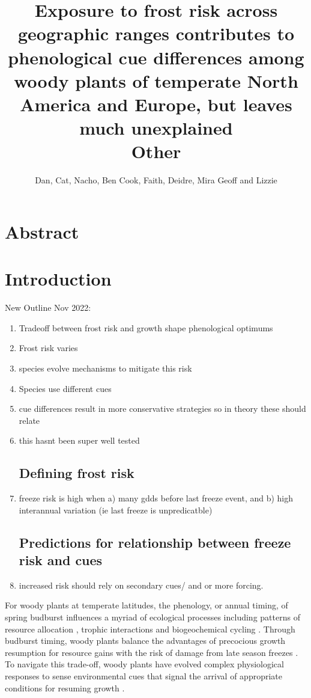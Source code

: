 \documentclass[12pt]{article}
\title{
Exposure to frost risk across geographic ranges contributes to phenological cue differences among woody plants of temperate North America and Europe, but leaves much unexplained\\
Other
}
\author{Dan, Cat, Nacho, Ben Cook, Faith, Deidre, Mira Geoff and Lizzie}
\begin{document}

\maketitle

\section*{Abstract}
\section*{Introduction}
New Outline Nov 2022:
\begin{enumerate}
\item Tradeoff between frost risk and growth shape phenological optimums
\item Frost risk varies
\item species evolve mechanisms to mitigate this risk
\item Species use different cues
\item cue differences result in more conservative strategies so in theory these should relate
\item this hasnt been super well tested
\subsection{Defining frost risk}
\item freeze risk is high when a) many gdds before last freeze event, and b) high interannual variation (ie last freeze is unpredicatble)
\subsection{Predictions for relationship between freeze risk and cues}
\item increased risk should rely on secondary cues/ and or more forcing.
\end{enumerate}


For woody plants at temperate latitudes, the phenology, or annual timing, of spring budburst influences a myriad of ecological processes including patterns of resource allocation \citep{Seiwa:1991vr}, trophic interactions \citep{Memmott2007} and biogeochemical cycling \citep{Piao2007}.
Through budburst timing, woody plants balance the advantages of precocious growth resumption for resource gains with the risk of damage from late season freezes \citep{Savage:2013aa}. 
To navigate this trade-off, woody plants have evolved complex physiological responses to sense environmental cues that signal the arrival of appropriate conditions for resuming growth \citep{}.
\end{document}
